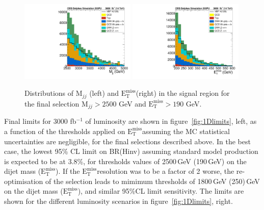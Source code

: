 \documentclass[../report.tex]{subfiles}
\newcommand{\MET}{\ensuremath{\mathrm{E}_{\mathrm{T}}^{\mathrm{miss}}}}
\begin{document}
\begin{figure}[htbp]
  \centering
    \includegraphics[width=0.49\textwidth]{./Mjj_200PU_auto.pdf}
    \includegraphics[width=0.49\textwidth]{metnolep_200PU_auto}
\caption{Distributions of M$_{jj}$ (left) and \MET (right) in the signal region for the final selection M$_{jj}>2500$ GeV and \MET$>190$ GeV.}
  \label{fig:plotsdijetmet}
\end{figure}

Final limits for 3000 fb$^{-1}$ of luminosity are shown in
figure~\ref{fig:1Dlimits}, left, as a function of the thresholds
applied on \MET assuming the MC statistical uncertainties are
negligible, for the final selections described above. In the best
case, the lowest 95\% CL limit on BR(Hinv) assuming standard model
production is expected to be at 3.8\%, for thresholds values of 2500\,GeV (190\,GeV) on the dijet mass (\MET). If the \MET resolution was to be a factor of 2 worse, the re-optimisation of the selection leads to mimimum thresholds of 1800\,GeV (250)\,GeV on the dijet mass (\MET), and similar 95\%CL limit sensitivity. The limits are shown for the different luminosity scenarios in figure~\ref{fig:1Dlimits}, right.
\end{document}
